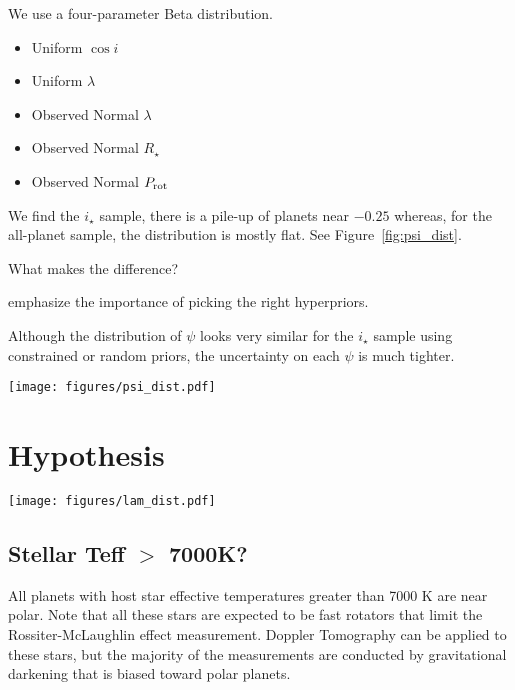 \documentclass[twocolumn]{aastex631}
\newcommand{\numistar}{65\xspace}
\newcommand{\numall}{161\xspace}
\begin{document}
We use a four-parameter Beta distribution.

\begin{itemize}
    \item Uniform $\cos{i}$
    \item Uniform $\lambda$
    \item Observed Normal $\lambda$
    \item Observed Normal $R_\star$
    \item Observed Normal $P_{\rm rot}$
\end{itemize}

We find the $i_\star$ sample, there is a pile-up of planets near $-0.25$ whereas, for the all-planet sample, the distribution is mostly flat. See Figure~\ref{fig:psi_dist}.

What makes the difference?

\cite{Nagpal22} emphasize the importance of picking the right hyperpriors.

Although the distribution of $\psi$ looks very similar for the $i_\star$ sample using constrained or random priors, the uncertainty on each $\psi$ is much tighter. 

\begin{figure*}[ht!]
    \begin{centering}
        \texttt{[image: figures/psi\_dist.pdf]}
        \caption{$\cos{\psi}$ distributions.}
        \label{fig:psi_dist}
    \end{centering}
\end{figure*}

\section{Hypothesis} \label{sec:tests}

\begin{figure*}[ht!]
    \begin{centering}
        \texttt{[image: figures/lam\_dist.pdf]}
        \caption{Sky-projected stellar obliquity ($\lambda$) distributions of \numistar systems with constrained $i_\star$ and all \numall exoplanetary systems that have measured sky-projected stellar obliquities.}
        \label{fig:lam_dist}
    \end{centering}
\end{figure*}


\subsection{Stellar Teff $>$ 7000K?}
All planets with host star effective temperatures greater than 7000 K are near polar.
Note that all these stars are expected to be fast rotators that limit the Rossiter-McLaughlin effect measurement. Doppler Tomography can be applied to these stars, but the majority of the measurements are conducted by gravitational darkening that is biased toward polar planets.
\end{document}
